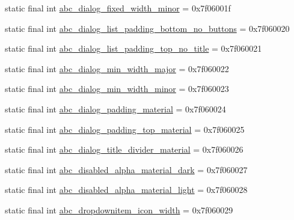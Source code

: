 \begin{DoxyCompactItemize}
\item 
static final int \mbox{\hyperlink{classandroid_1_1support_1_1design_1_1_r_1_1dimen_a5ebbb09ad981216b76fae7ab30ad724b}{abc\+\_\+dialog\+\_\+fixed\+\_\+width\+\_\+minor}} = 0x7f06001f
\item 
static final int \mbox{\hyperlink{classandroid_1_1support_1_1design_1_1_r_1_1dimen_ab52071bc335c5633a66a272e80e8a808}{abc\+\_\+dialog\+\_\+list\+\_\+padding\+\_\+bottom\+\_\+no\+\_\+buttons}} = 0x7f060020
\item 
static final int \mbox{\hyperlink{classandroid_1_1support_1_1design_1_1_r_1_1dimen_a9491c77705010b3d0ce622a6473423a8}{abc\+\_\+dialog\+\_\+list\+\_\+padding\+\_\+top\+\_\+no\+\_\+title}} = 0x7f060021
\item 
static final int \mbox{\hyperlink{classandroid_1_1support_1_1design_1_1_r_1_1dimen_a15f18eb1f09e97f0916635c3b780e3d4}{abc\+\_\+dialog\+\_\+min\+\_\+width\+\_\+major}} = 0x7f060022
\item 
static final int \mbox{\hyperlink{classandroid_1_1support_1_1design_1_1_r_1_1dimen_a6a73848d8d821f2d6fcf111851f69708}{abc\+\_\+dialog\+\_\+min\+\_\+width\+\_\+minor}} = 0x7f060023
\item 
static final int \mbox{\hyperlink{classandroid_1_1support_1_1design_1_1_r_1_1dimen_a520740e21ad1d52830d8977ff10afd5e}{abc\+\_\+dialog\+\_\+padding\+\_\+material}} = 0x7f060024
\item 
static final int \mbox{\hyperlink{classandroid_1_1support_1_1design_1_1_r_1_1dimen_affd502ad3ee057bb26d6ce1cd4cc89b6}{abc\+\_\+dialog\+\_\+padding\+\_\+top\+\_\+material}} = 0x7f060025
\item 
static final int \mbox{\hyperlink{classandroid_1_1support_1_1design_1_1_r_1_1dimen_aae14fca8db24b62c071e215399ad571c}{abc\+\_\+dialog\+\_\+title\+\_\+divider\+\_\+material}} = 0x7f060026
\item 
static final int \mbox{\hyperlink{classandroid_1_1support_1_1design_1_1_r_1_1dimen_a711065db6123eeca1bdda1feae6ee604}{abc\+\_\+disabled\+\_\+alpha\+\_\+material\+\_\+dark}} = 0x7f060027
\item 
static final int \mbox{\hyperlink{classandroid_1_1support_1_1design_1_1_r_1_1dimen_ad1756a425760ec484cfb76295400d4db}{abc\+\_\+disabled\+\_\+alpha\+\_\+material\+\_\+light}} = 0x7f060028
\item 
static final int \mbox{\hyperlink{classandroid_1_1support_1_1design_1_1_r_1_1dimen_acc8d9f0a4c9277aa49a4c1cc8090c70e}{abc\+\_\+dropdownitem\+\_\+icon\+\_\+width}} = 0x7f060029
\item 

\end{DoxyCompactItemize}

